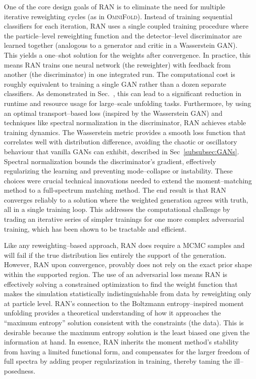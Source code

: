         One of the core design goals of RAN is to eliminate the need for multiple iterative reweighting cycles (as in \textsc{OmniFold}).
        Instead of training sequential classifiers for each iteration, RAN uses a single coupled training procedure where the particle--level reweighting function and the detector--level discriminator are learned together (analogous to a generator and critic in a Wasserstein GAN).
        This yields a one--shot solution for the weights after convergence.
        In practice, this means RAN trains one neural network (the reweighter) with feedback from another (the discriminator) in one integrated run.
        The computational cost is roughly equivalent to training a single GAN rather than a dozen separate classifiers.
        As demonstrated in Sec.~, this can lead to a significant reduction in runtime and resource usage for large--scale unfolding tasks.
        Furthermore, by using an optimal transport--based loss (inspired by the Wasserstein GAN) and techniques like spectral normalization in the discriminator, RAN achieves stable training dynamics.
        The Wasserstein metric provides a smooth loss function that correlates well with distribution difference, avoiding the chaotic or oscillatory behaviour that vanilla GANs can exhibit, described in Sec~\ref{subsubsec:GANs}.
        Spectral normalization bounds the discriminator’s gradient, effectively regularizing the learning and preventing mode--collapse or instability.
        These choices were crucial technical innovations needed to extend the moment--matching method to a full-spectrum matching method.
        The end result is that RAN converges reliably to a solution where the weighted generation agrees with truth, all in a single training loop.
        This addresses the computational challenge by trading an iterative series of simpler trainings for one more complex adversarial training, which has been shown to be tractable and efficient.

        Like any reweighting--based approach, RAN does require a MCMC samples and will fail if the true distribution lies entirely the support of the generation.
        However, RAN upon convergence, provably does not rely on the exact prior shape within the supported region.
        The use of an adversarial loss means RAN is effectively solving a constrained optimization to find the weight function that makes the simulation statistically indistinguishable from data by reweighting only at particle level.
        RAN’s connection to the Boltzmann entropy--inspired moment unfolding provides a theoretical understanding of how it approaches the “maximum entropy” solution consistent with the constraints (the data).
        This is desirable because the maximum entropy solution is the least biased one given the information at hand.
        In essence, RAN inherits the moment method’s stability from having a limited functional form, and compensates for the larger freedom of full spectra by adding proper regularization in training, thereby taming the ill--posedness.

